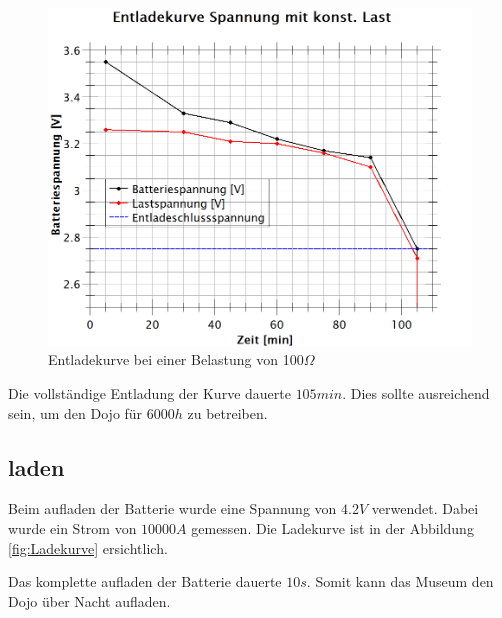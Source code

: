\begin{figure}[h]
	\centering
	\includegraphics[width=\textwidth]{graphics/EnladekurveSpannung.png}
	\caption{Entladekurve bei einer Belastung von 100$\Omega$}
	\label{fig:EntladekurveSpannung}
\end{figure}

Die vollständige Entladung der Kurve dauerte $105min$. Dies sollte ausreichend sein, um den Dojo für $6000h$ zu betreiben.






\subsection*{laden}
Beim aufladen der Batterie wurde eine Spannung von $4.2V$ verwendet. Dabei wurde ein Strom von $10000A$ gemessen. Die Ladekurve ist in der Abbildung \ref{fig:Ladekurve} ersichtlich.


Das komplette aufladen der Batterie dauerte $10s$. Somit kann das Museum den Dojo über Nacht aufladen.